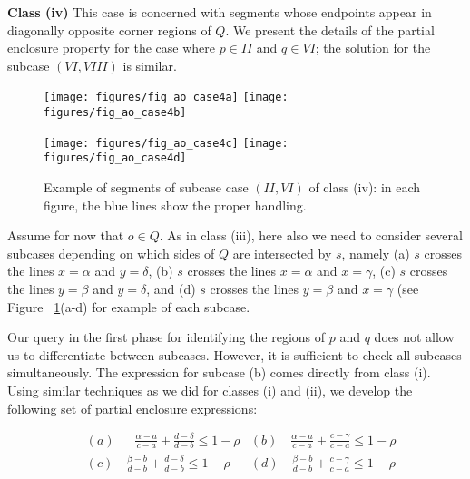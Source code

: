 {\bf Class (iv)}
This case is concerned with segments whose endpoints appear in 
diagonally opposite corner regions of $Q$. We present the details 
of the partial enclosure property for the case where $p \in II$ 
and $q \in VI$; the solution for the subcase $(VI, VIII)$ is similar.

\begin{figure}[t]
\begin{center}
  \texttt{[image: figures/fig\_ao\_case4a]}
  \hspace{1.0em}
  \texttt{[image: figures/fig\_ao\_case4b]}

  \vspace{2.0em}
  
  \texttt{[image: figures/fig\_ao\_case4c]}
  \hspace{1.0em}
  \texttt{[image: figures/fig\_ao\_case4d]}

  \caption{Example of segments of subcase case $(II, VI)$ of class (iv): 
  in each figure, the blue lines show the proper handling.}
  \label{fig:rectangles:ao:case4}
\end{center}
\end{figure}

Assume for now that $o \in Q$. As in class (iii), here also we need to 
consider several subcases depending on which sides of $Q$ are 
intersected by $s$, namely (a) $s$ crosses the lines $x=\alpha$ and 
$y=\delta$, (b) $s$ crosses the lines $x=\alpha$ and $x=\gamma$, 
(c) $s$ crosses the lines $y=\beta$ and $y=\delta$, and (d)
$s$ crosses the lines $y=\beta$ and $x=\gamma$ (see Figure~
\ref{fig:rectangles:ao:case4}(a-d) for example of each subcase. 

Our query in the first phase for identifying the regions of $p$ and $q$ 
does not allow us to differentiate between subcases. However, 
it is sufficient to check all subcases simultaneously. The 
expression for subcase (b) comes directly from class (i).
Using similar techniques as we did for classes (i) and (ii), 
we develop the following set of partial enclosure expressions:

\begin{align*}
& (a) \quad \; \; \frac{\alpha - a}{c - a} + \frac{d - \delta}{d - b} \leq 1 - 
\rho
& (b) \quad \frac{\alpha - a}{c - a} + \frac{c - \gamma}{c - a} \leq 1 - \rho \\
& (c) \quad \frac{\beta  - b}{d - b} + \frac{d - \delta}{d - b} \leq 1 - \rho  
& (d) \quad \frac{\beta  - b}{d - b} + \frac{c - \gamma}{c - a} \leq 1 - \rho \\
\end{align*}

